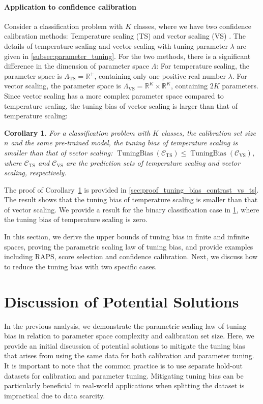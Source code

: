 \documentclass{article}
\newcommand{\1}{\mathbbm{1}}
\newcommand{\TuningBias}{\mathop{\text{TuningBias}}}
\theoremstyle{plain}
\newtheorem{corollary}[theorem]{Corollary}
\theoremstyle{definition}
\theoremstyle{remark}
\begin{document}
\paragraph{Application to confidence calibration} 
Consider a classification problem with $K$ classes, where we have two confidence calibration methods: Temperature scaling (TS) and vector scaling (VS) \citep{guo2017calibration, xi2024does, dabah2024temperature}. 
The details of temperature scaling and vector scaling with tuning parameter $\lambda$ are given in \cref{subsec:parameter_tuning}.
For the two methods, there is a significant difference in the dimension of parameter space $\Lambda$:
For temperature scaling, the parameter space is $\Lambda_{\text{TS}} = \mathbb{R}^+$, containing only one positive real number $\lambda$. 
For vector scaling, the parameter space is $\Lambda_{\text{VS}} = \mathbb{R}^{K} \times \mathbb{R}^K$, containing $2K$ parameters.
Since vector scaling has a more complex parameter space compared to temperature scaling, the tuning bias of vector scaling is larger than that of temperature scaling:
\begin{corollary}\label{corollary:tuning_bias_contrast_vs_ts}
    For a classification problem with $K$ classes, the calibration set size $n$ and the same pre-trained model, the tuning bias of temperature scaling is smaller than that of vector scaling: $\TuningBias({\mathcal{C}}_{\text{TS}}) \leq \TuningBias({\mathcal{C}}_{\text{VS}})$,
    where ${\mathcal{C}}_{\text{TS}}$ and ${\mathcal{C}}_{\text{VS}}$ are the prediction sets of temperature scaling and vector scaling, respectively.
\end{corollary} 
The proof of Corollary~\ref{corollary:tuning_bias_contrast_vs_ts} is provided in \cref{sec:proof_tuning_bias_contrast_vs_ts}. The result shows that the tuning bias of temperature scaling is smaller than that of vector scaling. We provide a result for the binary classification case in \cref{sec:discussion}, where the tuning bias of temperature scaling is zero.



In this section, we derive the upper bounds of tuning bias in finite and infinite spaces, proving the parametric scaling law of tuning bias, and provide examples including RAPS, score selection and confidence calibration. 
Next, we discuss how to reduce the tuning bias with two specific cases. 

\section{Discussion of Potential Solutions}
\label{sec:discussion}
In the previous analysis, we demonstrate the parametric scaling law of tuning bias in relation to parameter space complexity and calibration set size.
Here, we provide an initial discussion of potential solutions to mitigate the tuning bias that arises from using the same data for both calibration and parameter tuning. 
It is important to note that the common practice is to use separate hold-out datasets for calibration and parameter tuning.
Mitigating tuning bias can be particularly beneficial in real-world applications when splitting the dataset is impractical due to data scarcity.
\end{document}
